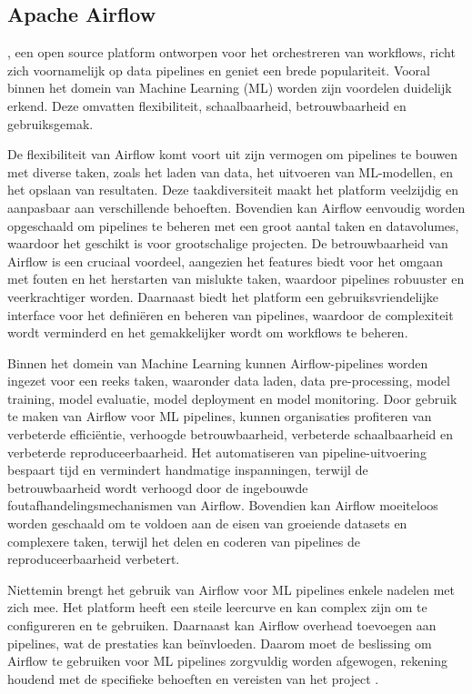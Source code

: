\subsection{Apache Airflow}

\textcite{ApacheAirflow2024}, een open source platform ontworpen voor het orchestreren van workflows, richt zich voornamelijk op data pipelines en geniet een brede populariteit. Vooral binnen het domein van Machine Learning (ML) worden zijn voordelen duidelijk erkend. Deze omvatten flexibiliteit, schaalbaarheid, betrouwbaarheid en gebruiksgemak.

De flexibiliteit van Airflow komt voort uit zijn vermogen om pipelines te bouwen met diverse taken, zoals het laden van data, het uitvoeren van ML-modellen, en het opslaan van resultaten. Deze taakdiversiteit maakt het platform veelzijdig en aanpasbaar aan verschillende behoeften. Bovendien kan Airflow eenvoudig worden opgeschaald om pipelines te beheren met een groot aantal taken en datavolumes, waardoor het geschikt is voor grootschalige projecten. De betrouwbaarheid van Airflow is een cruciaal voordeel, aangezien het features biedt voor het omgaan met fouten en het herstarten van mislukte taken, waardoor pipelines robuuster en veerkrachtiger worden. Daarnaast biedt het platform een gebruiksvriendelijke interface voor het definiëren en beheren van pipelines, waardoor de complexiteit wordt verminderd en het gemakkelijker wordt om workflows te beheren.

Binnen het domein van Machine Learning kunnen Airflow-pipelines worden ingezet voor een reeks taken, waaronder data laden, data pre-processing, model training, model evaluatie, model deployment en model monitoring. Door gebruik te maken van Airflow voor ML pipelines, kunnen organisaties profiteren van verbeterde efficiëntie, verhoogde betrouwbaarheid, verbeterde schaalbaarheid en verbeterde reproduceerbaarheid. Het automatiseren van pipeline-uitvoering bespaart tijd en vermindert handmatige inspanningen, terwijl de betrouwbaarheid wordt verhoogd door de ingebouwde foutafhandelingsmechanismen van Airflow. Bovendien kan Airflow moeiteloos worden geschaald om te voldoen aan de eisen van groeiende datasets en complexere taken, terwijl het delen en coderen van pipelines de reproduceerbaarheid verbetert.

Niettemin brengt het gebruik van Airflow voor ML pipelines enkele nadelen met zich mee. Het platform heeft een steile leercurve en kan complex zijn om te configureren en te gebruiken. Daarnaast kan Airflow overhead toevoegen aan pipelines, wat de prestaties kan beïnvloeden. Daarom moet de beslissing om Airflow te gebruiken voor ML pipelines zorgvuldig worden afgewogen, rekening houdend met de specifieke behoeften en vereisten van het project \autocite{Harenslak2021}.

